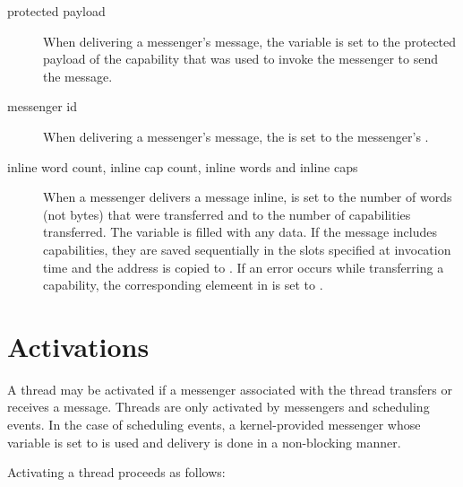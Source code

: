 \begin{description}
\item[protected payload]

When delivering a messenger's message, the 
variable is set to the protected payload of the capability that was
used to invoke the messenger to send the message.

\item[messenger id]

When delivering a messenger's message, the  is set
to the messenger's .

\item[inline word count, inline cap count, inline words \textmd{and}
  inline caps]

When a messenger delivers a message inline,  is
set to the number of words (not bytes) that were transferred and
 to the number of capabilities transferred.  The
 variable is filled with any data.  If the message
includes capabilities, they are saved sequentially in the slots
specified at invocation time and the address is copied to .  If an error occurs while transferring a capability,
the corresponding elemeent in  is set to
.

\end{description}

\section{Activations}

A thread may be activated if a messenger associated with the thread
transfers or receives a message.  Threads are only activated by
messengers and scheduling events.  In the case of scheduling events, a
kernel-provided messenger whose  variable is set to
 is used and delivery is done in a non-blocking manner.

Activating a thread proceeds as follows:

